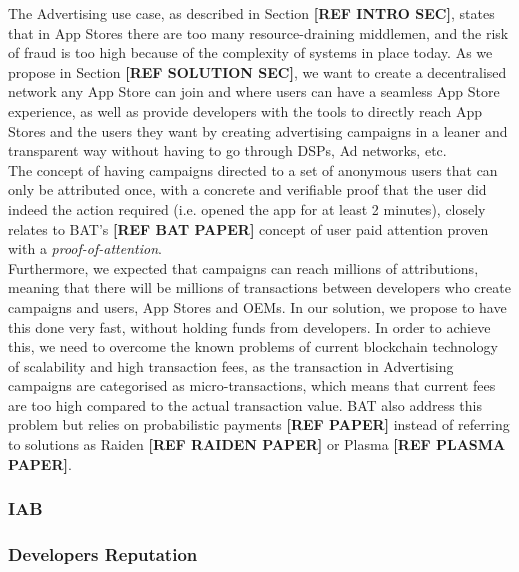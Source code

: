 The Advertising use case, as described in Section \textbf{[REF INTRO SEC]}, states that in App Stores there are too many resource-draining middlemen, and the risk of fraud is too high because of the complexity of systems in place today. As we propose in Section \textbf{[REF SOLUTION SEC]}, we want to create a decentralised network any App Store can join and where users can have a seamless App Store experience, as well as provide developers with the tools to directly reach App Stores and the users they want by creating advertising campaigns in a leaner and transparent way without having to go through DSPs, Ad networks, etc. \\

The concept of having campaigns directed to a set of anonymous users that can only be attributed once, with a concrete and verifiable proof that the user did indeed the action required (i.e. opened the app for at least 2 minutes), closely relates to BAT's \textbf{[REF BAT PAPER]} concept of user paid attention proven with a \textit{proof-of-attention}. \\

Furthermore, we expected that campaigns can reach millions of attributions, meaning that there will be millions of transactions between developers who create campaigns and users, App Stores and OEMs. In our solution, we propose to have this done very fast, without holding funds from developers. In order to achieve this, we need to overcome the known problems of current blockchain technology of scalability and high transaction fees, as the transaction in Advertising campaigns are categorised as micro-transactions, which means that current fees are too high compared to the actual transaction value. BAT also address this problem but relies on probabilistic payments \textbf{[REF PAPER]} instead of referring to solutions as Raiden \textbf{[REF RAIDEN PAPER]} or Plasma \textbf{[REF PLASMA PAPER]}.

\subsubsection{IAB}


\subsubsection{Developers Reputation}






